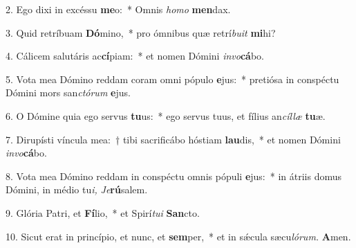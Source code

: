 \item 2. Ego dixi in excéssu \textbf{me}o:~* Omnis \textit{homo} \textbf{men}dax.
\item 3. Quid retríbuam \textbf{Dó}mino,~* pro ómnibus quæ retrí\textit{buit} \textbf{mi}hi?
\item 4. Cálicem salutáris ac\textbf{cí}piam:~* et nomen Dómini \textit{invo}\textbf{cá}bo.
\item 5. Vota mea Dómino reddam coram omni pópulo \textbf{e}jus:~* pretiósa in conspé\-ctu Dómini mors san\textit{ctórum} \textbf{e}jus.
\item 6. O Dómine quia ego servus \textbf{tu}us:~* ego servus tuus, et fílius an\textit{cíllæ} \textbf{tu}æ.
\item 7. Dirupísti víncula mea:~† tibi sacrificábo hóstiam \textbf{lau}dis,~* et nomen Dómini \textit{invo}\textbf{cá}bo.
\item 8. Vota mea Dómino reddam in conspéctu omnis pópuli \textbf{e}jus:~* in átriis domus Dómini, in médio tu\tinyhspace\textit{i,} \hspace{0.02em}\textit{Je}\textbf{rú}salem.
\item 9. Glória Patri, et \textbf{Fí}lio,~* et Spirí\tinyhspace\textit{tui} \textbf{San}cto.
\item 10. Sicut erat in princípio, et nunc, et \textbf{sem}per,~* et in sǽcula sæcu\tinyhspace\textit{lórum.} \textbf{A}men.
